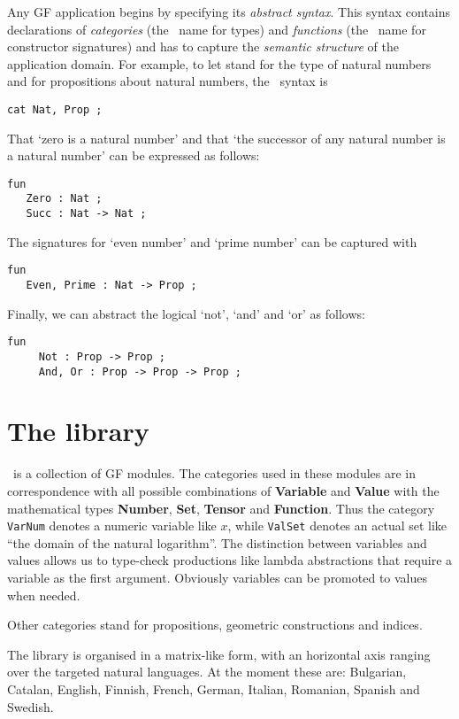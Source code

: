\documentclass[adraft,copyright,creativecommons]{eptcs}
\begin{document}
Any GF application begins by specifying its \emph{abstract syntax}. This
syntax contains declarations of \emph{categories} (the \GF\  name for
types) and \emph{functions} (the \GF\ name for constructor signatures) and
has to capture the \emph{semantic structure} of the application domain.
For example, to let \Nat{} stand for the type of natural numbers and
\Prop{} for propositions about natural numbers, the \GF\ syntax is
\begin{lstlisting}
cat Nat, Prop ;    
\end{lstlisting}
That `zero is a natural number' and that `the successor of
any natural number is a natural number' can be expressed as follows:
\begin{lstlisting}
fun
   Zero : Nat ;
   Succ : Nat -> Nat ;
\end{lstlisting}
The signatures for `even number' and `prime number' can be captured with
\begin{lstlisting}
fun
   Even, Prime : Nat -> Prop ;	
\end{lstlisting}
Finally, we can abstract the logical `not', `and' and `or' as follows:
\begin{lstlisting}
fun
     Not : Prop -> Prop ;
     And, Or : Prop -> Prop -> Prop ;    
\end{lstlisting}




\section{The library} %
\label{sec:the_library}

\MGL\ is a collection of GF modules. The categories used in these modules
are in correspondence with all possible combinations of \textbf{Variable}
and \textbf{Value} with the mathematical types
\textbf{Number}, \textbf{Set}, \textbf{Tensor} and \textbf{Function}.
Thus the category \texttt{VarNum} denotes a numeric
variable like $x$, while \texttt{ValSet} denotes an actual set like ``the
domain of the natural logarithm''.  The distinction between variables and
values allows us to type-check productions like lambda abstractions that
require a variable as the first argument.  Obviously variables can be
promoted to values when needed.

Other categories stand for propositions, geometric constructions and
indices.

The library is organised in a matrix-like form, with an horizontal axis
ranging over the targeted natural languages.  At the moment these are:
Bulgarian,
Catalan, English, Finnish, French, German, Italian, Romanian, Spanish and
Swedish.
\end{document}
